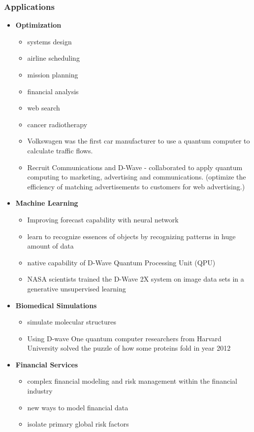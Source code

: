 \documentclass[xcolor=x11names,table]{beamer}
\begin{document}
	\begin{frame}[allowframebreaks]
		\frametitle{Applications}
		\begin{itemize}
			\item \textbf{Optimization}
			\begin{itemize}
				\item systems design
				\item airline scheduling
				\item mission planning
				\item financial analysis
				\item web search
				\item cancer radiotherapy
				\item Volkswagen was the first car manufacturer to use a quantum computer to calculate traffic flows. 
				\item Recruit Communications and D-Wave - collaborated to apply quantum computing to marketing, advertising and communications. (optimize the efficiency of matching advertisements to customers for web advertising.)
			\end{itemize}
			\newpage
			
			\item \textbf{Machine Learning}
			\begin{itemize}
				\item Improving forecast capability with neural network
				\item learn to recognize essences of objects by recognizing patterns in huge amount of data
				\item native capability of D-Wave Quantum Processing Unit (QPU)
				\item NASA scientists trained the D-Wave 2X system on image data sets in a generative unsupervised learning 
			\end{itemize}
			\newpage
			
			\item \textbf{Biomedical Simulations}
			\begin{itemize}
				\item simulate molecular structures
				\item Using D-wave One quantum computer researchers from Harvard University solved the puzzle of how some proteins fold in year 2012 
			\end{itemize}
			
			\item \textbf{Financial Services}
			\begin{itemize}
				\item complex financial modeling and risk management within the financial industry
				\item new ways to model financial data
				\item isolate primary global risk factors
			\end{itemize}
		\end{itemize}
	\end{frame}
	
\end{document}

